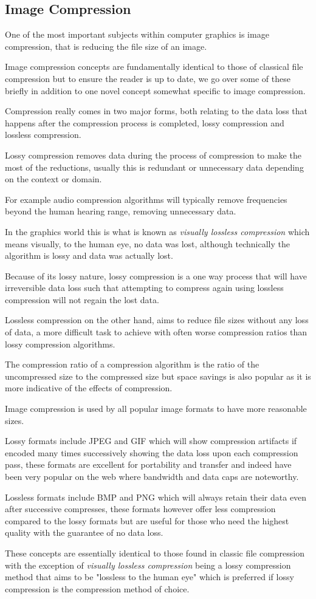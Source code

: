 \documentclass[12pt]{article}
\newcommand{\sentence}{} %
\newcommand{\italic}[1]{\textit{#1}}
\begin{document}
    \subsection{Image Compression}\label{subsec:image-compression}

    \tab
    One of the most important subjects within computer graphics is image compression, that is reducing the file size
    of an image.
    \sentence
    Image compression concepts are fundamentally identical to those of classical file compression but to ensure the
    reader is up to date, we go over some of these briefly in addition to one novel concept somewhat specific to
    image compression.
    \sentence
    Compression really comes in two major forms, both relating to the data loss that happens after the compression
    process is completed, lossy compression and lossless compression.
    \sentence
    Lossy compression removes data during the process of compression to make the most of the reductions, usually
    this is redundant or unnecessary data depending on the context or domain.
    \sentence
    For example audio compression algorithms will typically remove frequencies beyond the human hearing range,
    removing unnecessary data.
    \sentence
    In the graphics world this is what is known as \italic{visually lossless compression} which means visually, to
    the human eye, no data was lost, although technically the algorithm is lossy and data was actually lost.
    \sentence
    Because of its lossy nature, lossy compression is a one way process that will have irreversible data loss such
    that attempting to compress again using lossless compression will not regain the lost data.
    \sentence
    Lossless compression on the other hand, aims to reduce file sizes without any loss of data, a more difficult task
    to achieve with often worse compression ratios than lossy compression algorithms.
    \sentence
    The compression ratio of a compression algorithm is the ratio of the uncompressed size to the compressed size but
    space savings is also popular as it is more indicative of the effects of compression.
    \sentence

    \bigskip
    Image compression is used by all popular image formats to have more reasonable sizes.
    \sentence
    Lossy formats include JPEG and GIF which will show compression artifacts if encoded many times successively
    showing the data loss upon each compression pass, these formats are excellent for portability and transfer and
    indeed have been very popular on the web where bandwidth and data caps are noteworthy.
    \sentence
    Lossless formats include BMP and PNG which will always retain their data even after successive compresses, these
    formats however offer less compression compared to the lossy formats but are useful for those who need the
    highest quality with the guarantee of no data loss.
    \sentence
    These concepts are essentially identical to those found in classic file compression with the exception of
    \italic{visually lossless compression} being a lossy compression method that aims to be "lossless to the human
    eye" which is preferred if lossy compression is the compression method of choice.
\end{document}
